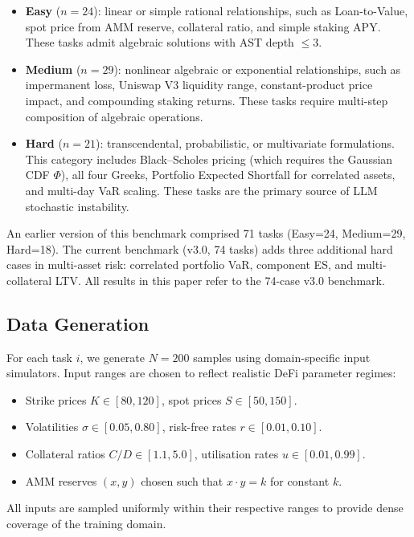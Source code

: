 \documentclass[twoside,11pt]{article}
\begin{document}
\begin{itemize}
  \item \textbf{Easy} ($n=24$): linear or simple rational relationships, such as
    Loan-to-Value, spot price from AMM reserve, collateral ratio, and simple staking APY.
    These tasks admit algebraic solutions with AST depth $\le 3$.

  \item \textbf{Medium} ($n=29$): nonlinear algebraic or exponential relationships,
    such as impermanent loss, Uniswap V3 liquidity range, constant-product price impact,
    and compounding staking returns.  These tasks require multi-step composition
    of algebraic operations.

  \item \textbf{Hard} ($n=21$): transcendental, probabilistic, or multivariate
    formulations.  This category includes Black--Scholes pricing (which requires
    the Gaussian CDF $\Phi$), all four Greeks, Portfolio Expected Shortfall for
    correlated assets, and multi-day VaR scaling.  These tasks are the primary
    source of LLM stochastic instability.
\end{itemize}

\begin{remark}
An earlier version of this benchmark comprised 71 tasks (Easy=24, Medium=29,
Hard=18).  The current benchmark (v3.0, 74 tasks) adds three additional hard
cases in multi-asset risk: correlated portfolio VaR, component ES, and
multi-collateral LTV.  All results in this paper refer to the 74-case v3.0 benchmark.
\end{remark}

\subsection{Data Generation}\label{subsec:data-generation}
\label{sec:bench_datagen}

For each task $i$, we generate $N=200$ samples using domain-specific input
simulators.  Input ranges are chosen to reflect realistic DeFi parameter regimes:
\begin{itemize}
  \item Strike prices $K \in [80, 120]$, spot prices $S \in [50, 150]$.
  \item Volatilities $\sigma \in [0.05, 0.80]$, risk-free rates $r \in [0.01, 0.10]$.
  \item Collateral ratios $C/D \in [1.1, 5.0]$, utilisation rates $u \in [0.01, 0.99]$.
  \item AMM reserves $(x, y)$ chosen such that $x \cdot y = k$ for constant $k$.
\end{itemize}
All inputs are sampled uniformly within their respective ranges to provide dense
coverage of the training domain.
\end{document}
